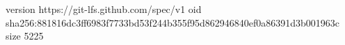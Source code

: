version https://git-lfs.github.com/spec/v1
oid sha256:881816dc3ff6983f7733bd53f244b355f95d862946840ef0a86391d3b001963c
size 5225
